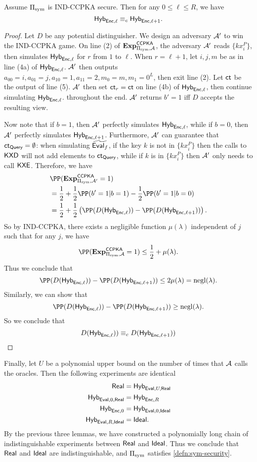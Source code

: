 \begin{lemma}
    Assume $\Pi_{\text{sym}}$ is IND-CCPKA secure. Then for any $0 \leq \ell \leq R$, we have
    $$\mathsf{Hyb}_{\mathsf{Enc}, \ell} \equiv_c \mathsf{Hyb}_{\mathsf{Enc}, \ell + 1}.$$
\end{lemma}
\begin{proof}
    Let $D$ be any potential distinguisher. We design an adversary $\mathcal{A}'$ to win the IND-CCPKA game. On line (2) of $\mathbf{Exp}^{\mathsf{CCPKA}}_{\Pi_{\text{sym}}, \mathcal{A}}$, the adversary $\mathcal{A}'$ reads $\{kx_i^P\}$, then simulates $\mathsf{Hyb}_{\mathsf{Enc}, \ell}$ for $r$ from $1$ to $\ell$. When $r = \ell + 1$, let $i, j, m$ be as in line (4a) of $\mathsf{Hyb}_{\mathsf{Enc}, \ell}$. $\mathcal{A}'$ then outputs $a_{00} = i, a_{01} = j, a_{10} = 1, a_{11} = 2, m_0 = m, m_1 = 0^L$, then exit line (2). Let $\mathsf{ct}$ be the output of line (5). $\mathcal{A}'$ then set $\mathsf{ct}_r = \mathsf{ct}$ on line (4b) of $\mathsf{Hyb}_{\mathsf{Enc}, \ell}$, then continue simulating $\mathsf{Hyb}_{\mathsf{Enc}, \ell}$. throughout the end. $\mathcal{A}'$ returns $b' = 1$ iff $D$ accepts the resulting view.

     Now note that if $b = 1$, then $\mathcal{A}'$ perfectly simulates $\mathsf{Hyb}_{\mathsf{Enc}, \ell}$, while if $b = 0$, then $\mathcal{A}'$ perfectly simulates $\mathsf{Hyb}_{\mathsf{Enc}, \ell+1}$. Furthermore, $\mathcal{A}'$ can guarantee that $\mathsf{ct}_{\mathsf{Query}} = \emptyset$: when simulating $\widetilde{\mathsf{Eval}_f}$, if the key $k$ is not in $\{kx_i^P\}$ then the calls to $\mathsf{KXD}$ will not add elements to $\mathsf{ct}_{\mathsf{Query}}$, while if $k$ is in $\{kx_i^P\}$ then $\mathcal{A}'$ only needs to call $\mathsf{KXE}$. Therefore, we have
    \begin{align*}
     &\PP(\mathbf{Exp}^{\mathsf{CCPKA}}_{\Pi_{\sym}, \cA'} = 1) \\
     &= \frac{1}{2} + \frac{1}{2}\PP(b' = 1 | b = 1) - \frac{1}{2}\PP(b' = 1 | b = 0) \\   
     &= \frac{1}{2} + \frac{1}{2}\left(\PP(D(\Hyb_{\enc, \ell})) - \PP(D(\Hyb_{\enc, \ell+1}))\right).
    \end{align*}
    So by IND-CCPKA, there exists a negligible function $\mu(\lambda)$ independent of $j$ such that for any $j$, we have
    $$\PP(\mathbf{Exp}^{\mathsf{CCPKA}}_{\Pi_{\sym}, \cA} = 1) \leq \frac{1}{2} + \mu(\lambda).$$
    Thus we conclude that
    $$\PP(D(\Hyb_{\enc, \ell})) - \PP(D(\Hyb_{\enc, \ell+1})) \leq 2\mu(\lambda) = \negl(\lambda).$$
    Similarly, we can show that
    $$\PP(D(\Hyb_{\enc, \ell})) - \PP(D(\Hyb_{\enc, \ell+1})) \geq \negl(\lambda).$$
    So we conclude that
    $$D(\mathsf{Hyb}_{\mathsf{Enc}, \ell})) \equiv_c D(\mathsf{Hyb}_{\mathsf{Enc}, \ell + 1}))$$
\end{proof}
Finally, let $U$ be a polynomial upper bound on the number of times that $\mathcal{A}$ calls the oracles. Then the following experiments are identical
\begin{align*}
\mathsf{Real} &= \mathsf{Hyb}_{\mathsf{Eval}, U, \mathsf{Real}} \\
\mathsf{Hyb}_{\mathsf{Eval}, 0, \mathsf{Real}} &= \mathsf{Hyb}_{\mathsf{Enc}, R} \\
\mathsf{Hyb}_{\mathsf{Enc}, 0} &= \mathsf{Hyb}_{\mathsf{Eval}, 0, \mathsf{Ideal}} \\
\mathsf{Hyb}_{\mathsf{Eval}, R, \mathsf{Ideal}} &= \mathsf{Ideal}.
\end{align*}
By the previous three lemmas, we have constructed a polynomially long chain of indistinguishable experiments between $\mathsf{Real}$ and $\mathsf{Ideal}$. Thus we conclude that $\mathsf{Real}$ and $\mathsf{Ideal}$ are indistinguishable, and $\Pi_{\text{sym}}$ satisfies \cref{defn:sym-security}.
\clearpage